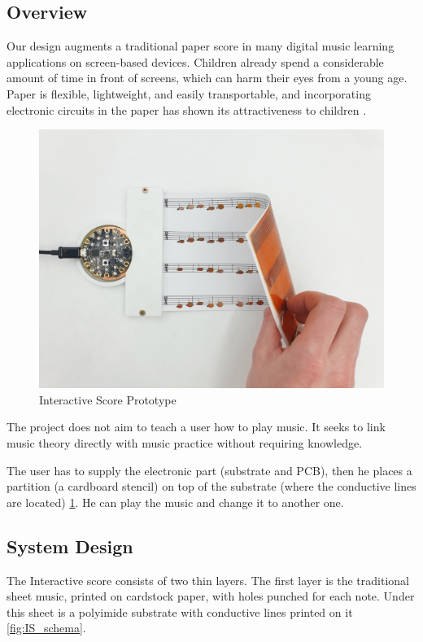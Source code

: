 \subsection{Overview}

Our design augments a traditional paper score in many digital music learning applications on screen-based devices. Children already spend a considerable amount of time in front of screens, which can harm their eyes from a young age. Paper is flexible, lightweight, and easily transportable, and incorporating electronic circuits in the paper has shown its attractiveness to children \cite{hershman2018light}. 

\begin{figure}[h]
   \centering
   \includegraphics{images/IS_demo.png}
   \caption{Interactive Score Prototype}
   \label{fig:IS_demo}
\end{figure}

The project does not aim to teach a user how to play music. It seeks to link music theory directly with music practice without requiring knowledge.

The user has to supply the electronic part (substrate and PCB), then he places a partition (a cardboard stencil) on top of the substrate (where
the conductive lines are located) \ref{fig:IS_demo}. He can play the music and change it to another one.

\subsection{System Design}

The Interactive score consists of two thin layers. The first layer is the traditional sheet
music, printed on cardstock paper, with holes punched for each note. Under this sheet
is a polyimide substrate with conductive lines printed on it \ref{fig:IS_schema}.

